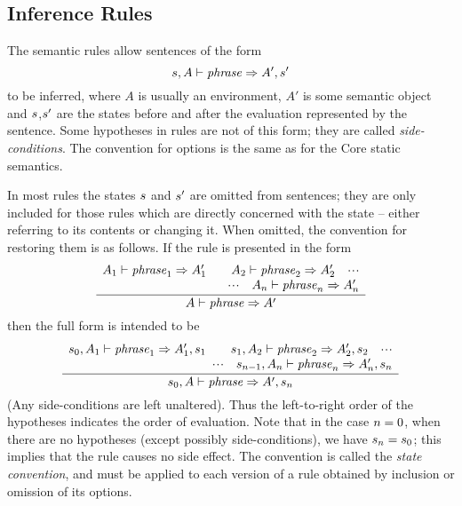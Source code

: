 \subsection{Inference Rules}
\label{dyncor-inf-rules-sec}
The semantic rules allow sentences  of the form
\[ s,A\vdash{\it phrase}\Rightarrow A',s' \]
to be inferred, where $A$ is usually an environment, $A'$ is some semantic
object and $s$,$s'$ are the states before and after the evaluation
represented by the sentence.  Some hypotheses in rules are not of this form;
they are called {\sl side-conditions}.  The convention for options is
the same as for the Core static semantics.

In most rules the states $s$ and $s'$ are omitted from sentences; they
are only included for those rules which are directly concerned with the state
-- either referring to its contents or changing it.  When omitted, the
convention for restoring them is as follows.  If the rule is presented in the
form
\[ \frac{ \begin{array}{r}
          A_1\vdash{\it phrase}_1\Rightarrow A_1'\qquad
          A_2\vdash{\it phrase}_2\Rightarrow A_2'\quad\mbox{$\cdot\!\cdot\!\cdot$}\\
          \mbox{$\cdot\!\cdot\!\cdot$}\quad A_n\vdash{\it phrase}_n\Rightarrow A_n'
          \end{array}
        }
        { A\vdash{\it phrase}\Rightarrow A'} \]
\oldpagebreak
then the full form is intended to be
\[ \frac{ \begin{array}{r}
          s_0,A_1\vdash{\it phrase}_1\Rightarrow A_1',s_1\qquad
          s_1,A_2\vdash{\it phrase}_2\Rightarrow A_2',s_2\quad\mbox{$\cdot\!\cdot\!\cdot$}\\
          \mbox{$\cdot\!\cdot\!\cdot$}\quad s_{n-1},A_n\vdash{\it phrase}_n\Rightarrow A_n',s_n
          \end{array}
        }
        { s_0,A\vdash{\it phrase}\Rightarrow A',s_n} \]
(Any side-conditions are left unaltered).
Thus the left-to-right order of the hypotheses indicates the order of
evaluation.  Note that in the case $n=0$, when there are no hypotheses
(except possibly side-conditions), we have $s_n=s_0$; this implies that the
rule causes no side effect.
The convention is called the {\sl state convention}, and
must be applied to each version of a rule obtained by inclusion or
omission of its options.

